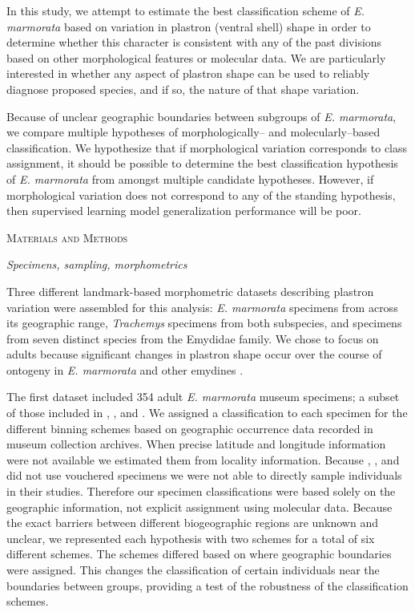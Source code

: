 \documentclass[12pt,letterpaper]{article}
\renewcommand{\section}[1]{%
\bigskip
\begin{center}
\begin{Large}
\normalfont\scshape #1
\medskip
\end{Large}
\end{center}}
\renewcommand{\subsection}[1]{%
\bigskip
\begin{center}
\begin{large}
\normalfont\itshape #1
\end{large}
\end{center}}
\begin{document}
In this study, we attempt to estimate the best classification scheme of \textit{E. marmorata} based on variation in plastron (ventral shell) shape in order to determine whether this character is consistent with any of the past divisions based on other morphological features or molecular data. We are particularly interested in whether any aspect of plastron shape can be used to reliably diagnose \citet{Spinks2014} proposed species, and if so, the nature of that shape variation.

Because of unclear geographic boundaries between subgroups of \textit{E. marmorata}, we compare multiple hypotheses of morphologically-- and molecularly--based classification. We hypothesize that if morphological variation corresponds to class assignment, it should be possible to determine the best classification hypothesis of \textit{E. marmorata} from amongst multiple candidate hypotheses. However, if morphological variation does not correspond to any of the standing hypothesis, then supervised learning model generalization performance will be poor.


\section{Materials and Methods}
\subsection{Specimens, sampling, morphometrics}
Three different landmark-based morphometric datasets describing plastron variation were assembled for this analysis: \textit{E. marmorata} specimens from across its geographic range, \textit{Trachemys} specimens from both subspecies, and specimens from seven distinct species from the Emydidae family. We chose to focus on adults because significant changes in plastron shape occur over the course of ontogeny in \textit{E. marmorata} and other emydines \citep{Angielczyk2013a}.

The first dataset included 354 adult \textit{E. marmorata} museum specimens; a subset of those included in \citet{Angielczyk2007}, \citet{Angielczyk2011}, and \citet{Angielczyk2013a}. We assigned a classification to each specimen for the different binning schemes based on geographic occurrence data recorded in museum collection archives. When precise latitude and longitude information were not available we estimated them from locality information. Because \citet{Spinks2005}, \citet{Spinks2010}, and \citet{Spinks2014} did not use vouchered specimens we were not able to directly sample individuals in their studies. Therefore our specimen classifications were based solely on the geographic information, not explicit assignment using molecular data. Because the exact barriers between different biogeographic regions are unknown and unclear, we represented each hypothesis with two schemes for a total of six different schemes. The schemes differed based on where geographic boundaries were assigned. This changes the classification of certain individuals near the boundaries between groups, providing a test of the robustness of the classification schemes.
\end{document}
